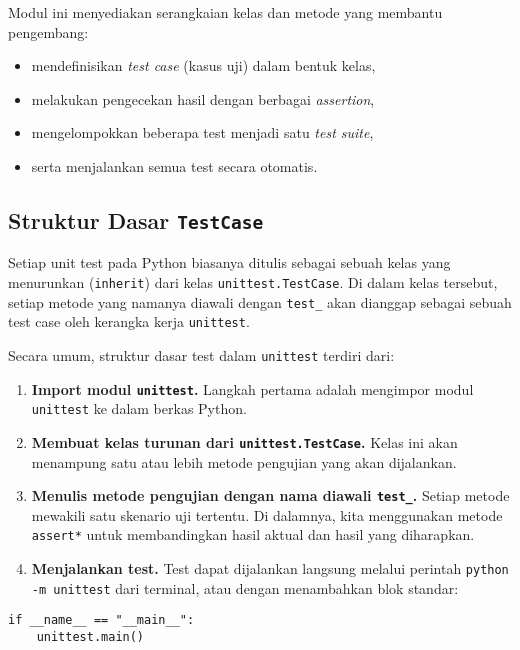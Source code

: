 Modul ini menyediakan serangkaian kelas dan metode yang membantu pengembang:
\begin{itemize}
    \item mendefinisikan \textit{test case} (kasus uji) dalam bentuk kelas,
    \item melakukan pengecekan hasil dengan berbagai \textit{assertion},
    \item mengelompokkan beberapa test menjadi satu \textit{test suite},
    \item serta menjalankan semua test secara otomatis.
\end{itemize}

\subsection{Struktur Dasar \texttt{TestCase}}

Setiap unit test pada Python biasanya ditulis sebagai sebuah kelas yang menurunkan (\texttt{inherit}) dari kelas \texttt{unittest.TestCase}.  
Di dalam kelas tersebut, setiap metode yang namanya diawali dengan \texttt{test\_} akan dianggap sebagai sebuah test case oleh kerangka kerja \texttt{unittest}.

Secara umum, struktur dasar test dalam \texttt{unittest} terdiri dari:

\begin{enumerate}
    \item \textbf{Import modul \texttt{unittest}.}  
    Langkah pertama adalah mengimpor modul \texttt{unittest} ke dalam berkas Python.

    \item \textbf{Membuat kelas turunan dari \texttt{unittest.TestCase}.}  
    Kelas ini akan menampung satu atau lebih metode pengujian yang akan dijalankan.

    \item \textbf{Menulis metode pengujian dengan nama diawali \texttt{test\_}.}  
    Setiap metode mewakili satu skenario uji tertentu.  
    Di dalamnya, kita menggunakan metode \texttt{assert*} untuk membandingkan hasil aktual dan hasil yang diharapkan.

    \item \textbf{Menjalankan test.}  
    Test dapat dijalankan langsung melalui perintah \texttt{python -m unittest} dari terminal, atau dengan menambahkan blok standar:
\end{enumerate}

\begin{lstlisting}[style=PythonStyle, caption={Blok eksekusi test bawaan}, label={lst:main-block}]
if __name__ == "__main__":
    unittest.main()
\end{lstlisting}


